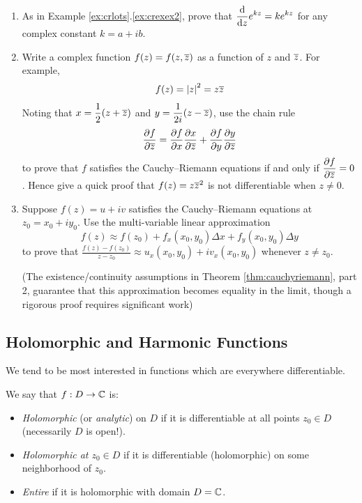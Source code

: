 \begin{exercises}{}
\begin{enumerate}
	  
	  \item As in Example \ref*{ex:crlots}.\ref{ex:crexex2}, prove that $\displaystyle \diff ze^{kz} =ke^{kz}$ for any complex constant $k=a+ib$.
	  
	  
	  \item Write a complex function $f(z)=f(z,\cl z)$ as a function of $z$ and $\cl z$. For example,
	  \[
	  	f(z)=\nm z^2=z\cl z
	  \]
	  Noting that $\displaystyle x=\frac 12(z+\cl z)$ and $\displaystyle y=\frac 1{2i}(z-\cl z)$, use the chain rule
	  \[
			\partials[f]{\cl z}=\partials[f]{x}\partials[x]{\cl z}+\partials[f]{y}\partials[y]{\cl z}
		\]
	  to prove that $f$ satisfies the Cauchy--Riemann equations if and only if $\displaystyle \partials[f]{\cl z}=0$.\smallbreak
	  Hence give a quick proof that $f(z)=z\cl z^2$ is not differentiable when $z\neq 0$.
	  
	  
	  \item\label{exs:crconv} Suppose $f(z)=u+iv$ satisfies the Cauchy--Riemann equations at $z_0=x_0+iy_0$. Use the multi-variable linear approximation
	  \[
	  	f(z)\approx f(z_0)+f_x(x_0,y_0)\Delta x+f_y(x_0,y_0)\Delta y
	  \]
	  to prove that $\frac{f(z)-f(z_0)}{z-z_0}\approx u_x(x_0,y_0)+iv_x(x_0,y_0)$ whenever $z\neq z_0$.\par
		(The existence/continuity assumptions in Theorem \ref{thm:cauchyriemann}, part 2, guarantee that this approximation becomes equality in the limit, though a rigorous proof requires significant work)
	\end{enumerate}
\end{exercises}

\clearpage



\subsection{Holomorphic and Harmonic Functions}\label{subsec:analytic}%

We tend to be most interested in functions which are everywhere differentiable.

\begin{defn}{}{}
	We say that $f:D\to\C$ is:
	\begin{itemize}
	  \item \emph{Holomorphic} (or \emph{analytic}\footnotemark) on $D$ if it is differentiable at all points $z_0\in D$ (necessarily $D$ is open!).
	  \item \emph{Holomorphic at $z_0\in D$} if it is differentiable (holomorphic) on some neighborhood of $z_0$.
	  \item \emph{Entire} if it is holomorphic with domain $D=\C$.
	\end{itemize}
\end{defn}

